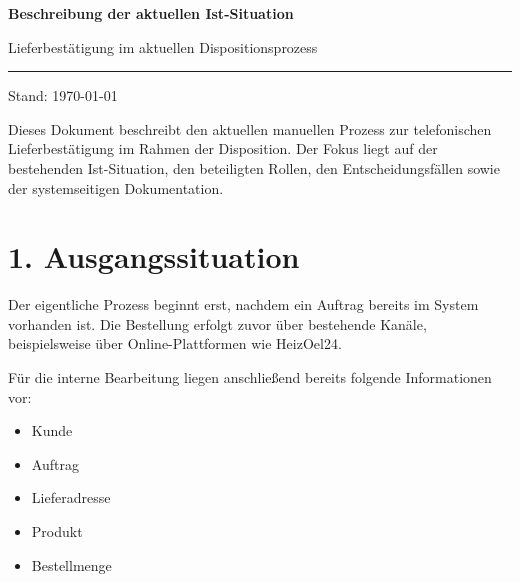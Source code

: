 \documentclass[a4paper,11pt]{article}
\begin{document}
	
	
	\begin{center}
		\vspace*{0.5cm}
		
		{\LARGE\bfseries\color{mainblue}
			Beschreibung der aktuellen Ist-Situation}
		
		\vspace{0.3cm}
		
		{\large Lieferbestätigung im aktuellen Dispositionsprozess}
		
		\vspace{0.5cm}
		
		\rule{0.75\textwidth}{0.5pt}
		
		\vspace{0.3cm}
		
		{\small Stand: \today}
	\end{center}
	
	\vspace{0.8cm}
	
	\begin{infobox}
		Dieses Dokument beschreibt den aktuellen manuellen Prozess zur telefonischen
		Lieferbestätigung im Rahmen der Disposition. Der Fokus liegt auf der bestehenden
		Ist-Situation, den beteiligten Rollen, den Entscheidungsfällen sowie der
		systemseitigen Dokumentation.
	\end{infobox}
	
	\vspace{0.8cm}
	
	
	\section*{1. Ausgangssituation}
	
	Der eigentliche Prozess beginnt erst, nachdem ein Auftrag bereits im System
	vorhanden ist. Die Bestellung erfolgt zuvor über bestehende Kanäle,
	beispielsweise über Online-Plattformen wie HeizOel24.
	
	Für die interne Bearbeitung liegen anschließend bereits folgende Informationen vor:
	
	\begin{itemize}
		\item Kunde
		\item Auftrag
		\item Lieferadresse
		\item Produkt
		\item Bestellmenge
	\end{itemize}
	
\end{document}
